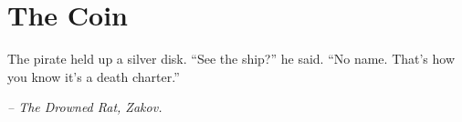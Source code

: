 \chapter*{The Coin}

The pirate held up a silver disk. ``See the ship?'' he said. ``No name. That's how you know it's a death charter.''

\smallskip

\noindent \textit{-- The Drowned Rat, Zakov.}

